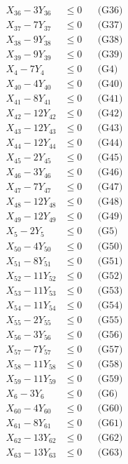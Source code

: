 \documentclass[a4paper,10pt]{article}
\begin{document}
{\begin{align}
X_{36} - 3Y_{36} &\leq 0 && \text{(G36)} \\
X_{37} - 7Y_{37} &\leq 0 && \text{(G37)} \\
X_{38} - 9Y_{38} &\leq 0 && \text{(G38)} \\
X_{39} - 9Y_{39} &\leq 0 && \text{(G39)} \\
X_{4} - 7Y_{4} &\leq 0 && \text{(G4)} \\
X_{40} - 4Y_{40} &\leq 0 && \text{(G40)} \\
X_{41} - 8Y_{41} &\leq 0 && \text{(G41)} \\
X_{42} - 12Y_{42} &\leq 0 && \text{(G42)} \\
X_{43} - 12Y_{43} &\leq 0 && \text{(G43)} \\
X_{44} - 12Y_{44} &\leq 0 && \text{(G44)} \\
\allowbreak
X_{45} - 2Y_{45} &\leq 0 && \text{(G45)} \\
X_{46} - 3Y_{46} &\leq 0 && \text{(G46)} \\
X_{47} - 7Y_{47} &\leq 0 && \text{(G47)} \\
X_{48} - 12Y_{48} &\leq 0 && \text{(G48)} \\
X_{49} - 12Y_{49} &\leq 0 && \text{(G49)} \\
X_{5} - 2Y_{5} &\leq 0 && \text{(G5)} \\
X_{50} - 4Y_{50} &\leq 0 && \text{(G50)} \\
X_{51} - 8Y_{51} &\leq 0 && \text{(G51)} \\
X_{52} - 11Y_{52} &\leq 0 && \text{(G52)} \\
X_{53} - 11Y_{53} &\leq 0 && \text{(G53)} \\
X_{54} - 11Y_{54} &\leq 0 && \text{(G54)} \\
X_{55} - 2Y_{55} &\leq 0 && \text{(G55)} \\
X_{56} - 3Y_{56} &\leq 0 && \text{(G56)} \\
X_{57} - 7Y_{57} &\leq 0 && \text{(G57)} \\
X_{58} - 11Y_{58} &\leq 0 && \text{(G58)} \\
X_{59} - 11Y_{59} &\leq 0 && \text{(G59)} \\
X_{6} - 3Y_{6} &\leq 0 && \text{(G6)} \\
X_{60} - 4Y_{60} &\leq 0 && \text{(G60)} \\
X_{61} - 8Y_{61} &\leq 0 && \text{(G61)} \\
X_{62} - 13Y_{62} &\leq 0 && \text{(G62)} \\
\allowbreak
X_{63} - 13Y_{63} &\leq 0 && \text{(G63)} \\

\end{align}}
\end{document}
